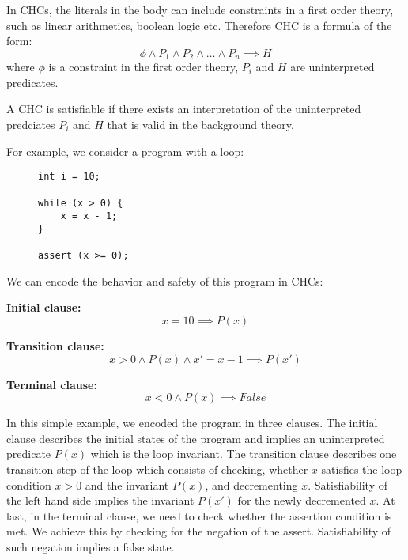 \vspace{\baselineskip}
In CHCs, the literals in the body can include constraints in a first order theory, such as linear arithmetics, boolean logic etc.
Therefore CHC is a formula of the form:
\begin{equation}
    \phi \land P_{1} \land P_{2} \land \dots \land P_{n} \implies H
\end{equation}
where $\phi$ is a constraint in the first order theory, $P_i$ and $H$ are uninterpreted predicates. 

\vspace{\baselineskip}\noindent
A CHC is satisfiable if there exists an interpretation of the uninterpreted predciates $P_i$ and $H$ that is valid in the background theory.

\vspace{\baselineskip}\noindent
For example, we consider a program with a loop:

\vspace{\baselineskip}
\begin{figure}[h]
\begin{mdframed}
\begin{lstlisting}
int i = 10;

while (x > 0) {
    x = x - 1;
}

assert (x >= 0);
\end{lstlisting}
\end{mdframed}
\end{figure}

We can encode the behavior and safety of this program in CHCs:

\vspace{\baselineskip}
\textbf{Initial clause:}
\begin{equation}
    x = 10 \implies P(x)
\end{equation}

\vspace{\baselineskip}
\textbf{Transition clause:}
\begin{equation}
    x > 0 \land P(x) \land x' = x - 1 \implies P(x')
\end{equation}

\vspace{\baselineskip}
\textbf{Terminal clause:}
\begin{equation}
    x < 0 \land P(x) \implies False
\end{equation}

In this simple example, we encoded the program in three clauses. The initial
clause describes the initial states of the program and implies an uninterpreted
predicate $P(x)$ which is the loop invariant. The transition clause describes one
transition step of the loop which consists of checking, whether $x$ satisfies the
loop condition $x > 0$ and the invariant $P(x)$, and decrementing $x$. Satisfiability
of the left hand side implies the invariant $P(x')$ for the newly decremented $x$.
At last, in the terminal clause, we need to check whether the assertion
condition is met. We achieve this by checking for the negation of the assert.
Satisfiability of such negation implies a false state.

